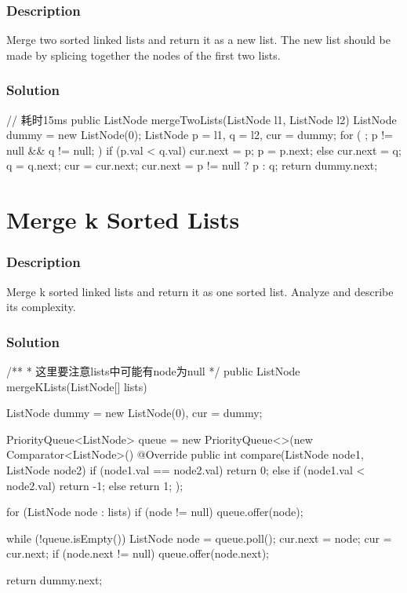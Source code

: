 \subsubsection{Description}
Merge two sorted linked lists and return it as a new list. The new list should be made by splicing together the nodes of the first two lists.

\subsubsection{Solution}

\begin{Code}
// 耗时15ms
public ListNode mergeTwoLists(ListNode l1, ListNode l2) {
    ListNode dummy = new ListNode(0);
    ListNode p = l1, q = l2, cur = dummy;
    for ( ; p != null && q != null; ) {
        if (p.val < q.val) {
            cur.next = p;
            p = p.next;
        } else {
            cur.next = q;
            q = q.next;
        }
        cur = cur.next;
    }
    cur.next = p != null ? p : q;
    return dummy.next;
}
\end{Code}

\newpage

\section{Merge k Sorted Lists} %

\subsubsection{Description}
Merge k sorted linked lists and return it as one sorted list. Analyze and describe its complexity.

\subsubsection{Solution}

\begin{Code}
/**
 * 这里要注意lists中可能有node为null
 */
public ListNode mergeKLists(ListNode[] lists) {
    ListNode dummy = new ListNode(0), cur = dummy;

    PriorityQueue<ListNode> queue = new PriorityQueue<>(new Comparator<ListNode>() {
        @Override
        public int compare(ListNode node1, ListNode node2) {
            if (node1.val == node2.val) {
                return 0;
            } else if (node1.val < node2.val) {
                return -1;
            } else {
                return 1;
            }
        }
    });

    for (ListNode node : lists) {
        if (node != null) {
            queue.offer(node);
        }
    }

    while (!queue.isEmpty()) {
        ListNode node = queue.poll();
        cur.next = node;
        cur = cur.next;
        if (node.next != null) {
            queue.offer(node.next);
        }
    }

    return dummy.next;
}
\end{Code}

